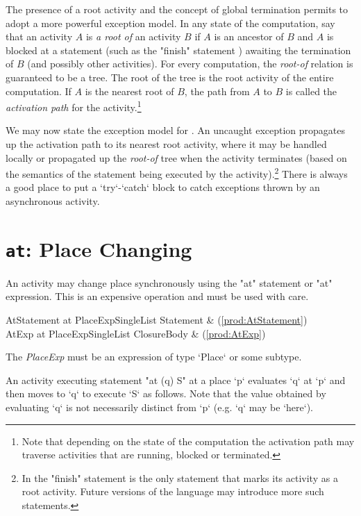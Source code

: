 The presence of a root activity and the concept of global termination permits
\Xten{} to adopt a more powerful exception model. In any state of the
computation, say that an activity $A$ is {\em a root of} an activity $B$ if
$A$ is an ancestor of $B$ and $A$ is blocked at a statement (such as the
\xcd"finish" statement ) awaiting the termination of $B$ (and
possibly other activities). For every \Xten{} computation, the \emph{root-of}
relation is guaranteed to be a tree. The root of the tree is the root activity
of the entire computation. If $A$ is the nearest root of $B$, the path from
$A$ to $B$ is called the {\em activation path} for the activity.\footnote{Note
  that depending on the state of the computation the activation path may
  traverse activities that are running, blocked or terminated.}

We may now state the exception model for \Xten.  An uncaught exception
propagates up the activation path to its nearest root activity, where
it may be handled locally or propagated up the \emph{root-of} tree when
the activity terminates (based on the semantics of the statement being
executed by the activity).\footnote{In \XtenCurrVer{} the \xcd"finish"
statement is the only statement that marks its activity as a root
activity. Future versions of the language may introduce more such
statements.}  
There is always a good place to put a \xcd`try`-\xcd`catch` block to catch
exceptions thrown by an asynchronous activity.

\section{ {\tt at}: Place Changing}\label{AtStatement}

An activity may change place synchronously using the \xcd"at" statement or
\xcd"at" expression. This is an expensive operation and must be used
with care.

\begin{bbgrammar}
 AtStatement    \: at PlaceExpSingleList Statement & (\ref{prod:AtStatement})\\%
 AtExp    \: at PlaceExpSingleList ClosureBody & (\ref{prod:AtExp})\\%
\end{bbgrammar}

The {\it PlaceExp} must be an expression of type \xcd`Place` or some subtype.

An activity executing statement \xcd"at (q) S" at a place \xcd`p`
evaluates \xcd`q` at \xcd`p` and then moves to \xcd`q` to execute
\xcd`S` as follows. Note that the value obtained by evaluating \xcd`q`
is not necessarily distinct from \xcd`p` (e.g.{} \xcd`q` may be
\xcd`here`).

